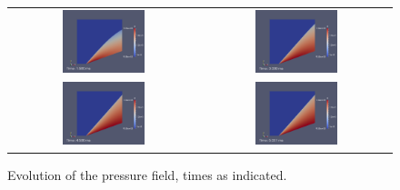 \begin{figure}[htbp]
\begin{center}
\begin{tabular}{cc}
\includegraphics[width=0.45\textwidth]{../2D/cone20-simple/cone20-p-field-fine-t-1p5.png} &
\includegraphics[width=0.45\textwidth]{../2D/cone20-simple/cone20-p-field-fine-t-3p0.png} \\
\includegraphics[width=0.45\textwidth]{../2D/cone20-simple/cone20-p-field-fine-t-4p5.png} &
\includegraphics[width=0.45\textwidth]{../2D/cone20-simple/cone20-p-field-fine-t-5p0.png} \\
\end{tabular}
\end{center}
\caption{Evolution of the pressure field, times as indicated.}
\label{cone20-p-field-evolution-fig}
\end{figure}

